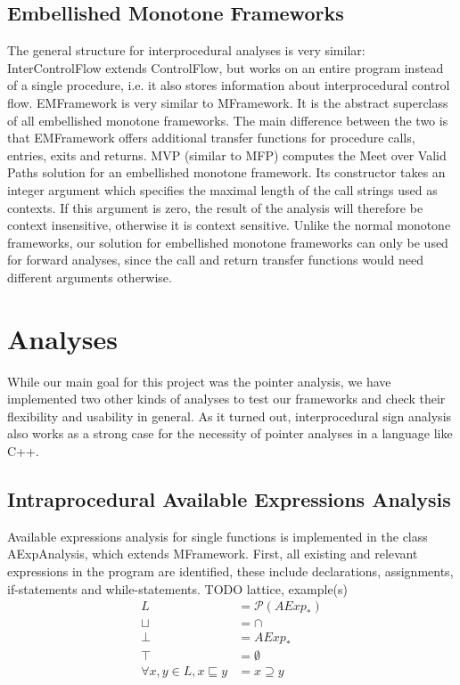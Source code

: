 \documentclass[a4paper,11pt]{article}
\begin{document}
\subsection{Embellished Monotone Frameworks}
The general structure for interprocedural analyses is very similar:
InterControlFlow extends ControlFlow, but works on an entire program instead of a single procedure, i.e. it also stores information about interprocedural control flow. 
EMFramework is very similar to MFramework. It is the abstract superclass of all embellished monotone frameworks. The main difference between the two is that EMFramework offers additional transfer functions for procedure calls, entries, exits and returns.
MVP (similar to MFP) computes the Meet over Valid Paths solution for an embellished monotone framework. Its constructor takes an integer argument which specifies the maximal length of the call strings used as contexts. If this argument is zero, the result of the analysis will therefore be context insensitive, otherwise it is context sensitive.
Unlike the normal monotone frameworks, our solution for embellished monotone frameworks can only be used for forward analyses, since the call and return transfer functions would need different arguments otherwise.

\section{Analyses}
While our main goal for this project was the pointer analysis, we have implemented two other kinds of analyses to test our frameworks and check their flexibility and usability in general. As it turned out, interprocedural sign analysis also works as a strong case for the necessity of pointer analyses in a language like C++.

\subsection{Intraprocedural Available Expressions Analysis}
Available expressions analysis for single functions is implemented in the class AExpAnalysis, which extends MFramework. First, all existing and relevant expressions in the program are identified, these include declarations, assignments, if-statements and while-statements.
TODO lattice, example(s)
\begin{align*}
  L &= \mathcal{P}(\textbf{$AExp_*$})\\
  \sqcup &= \cap \\
  \bot  &= \textbf{$AExp_*$}\\
  \top &= \emptyset \\
  \forall x, y \in L, x \sqsubseteq y &= x \supseteq y
\end{align*}
\end{document}

